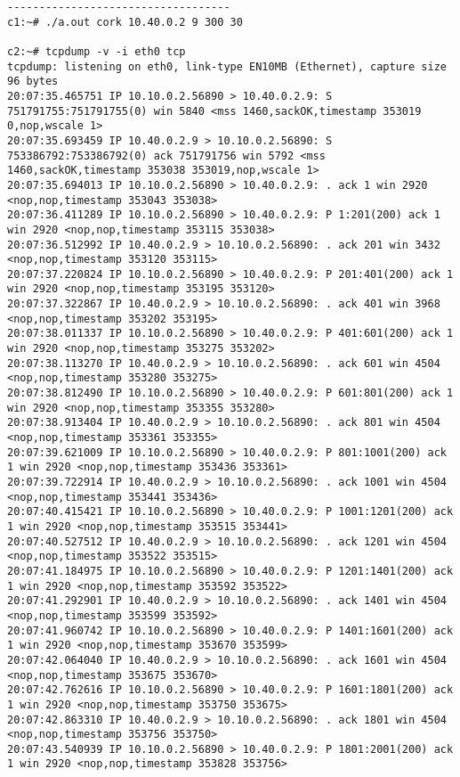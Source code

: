 \documentclass[a4paper,12pt]{article}
\begin{document}
\begin{lstlisting}
-----------------------------------
c1:~# ./a.out cork 10.40.0.2 9 300 30

c2:~# tcpdump -v -i eth0 tcp
tcpdump: listening on eth0, link-type EN10MB (Ethernet), capture size 96 bytes
20:07:35.465751 IP 10.10.0.2.56890 > 10.40.0.2.9: S 751791755:751791755(0) win 5840 <mss 1460,sackOK,timestamp 353019 0,nop,wscale 1>
20:07:35.693459 IP 10.40.0.2.9 > 10.10.0.2.56890: S 753386792:753386792(0) ack 751791756 win 5792 <mss 1460,sackOK,timestamp 353038 353019,nop,wscale 1>
20:07:35.694013 IP 10.10.0.2.56890 > 10.40.0.2.9: . ack 1 win 2920 <nop,nop,timestamp 353043 353038>
20:07:36.411289 IP 10.10.0.2.56890 > 10.40.0.2.9: P 1:201(200) ack 1 win 2920 <nop,nop,timestamp 353115 353038>
20:07:36.512992 IP 10.40.0.2.9 > 10.10.0.2.56890: . ack 201 win 3432 <nop,nop,timestamp 353120 353115>
20:07:37.220824 IP 10.10.0.2.56890 > 10.40.0.2.9: P 201:401(200) ack 1 win 2920 <nop,nop,timestamp 353195 353120>
20:07:37.322867 IP 10.40.0.2.9 > 10.10.0.2.56890: . ack 401 win 3968 <nop,nop,timestamp 353202 353195>
20:07:38.011337 IP 10.10.0.2.56890 > 10.40.0.2.9: P 401:601(200) ack 1 win 2920 <nop,nop,timestamp 353275 353202>
20:07:38.113270 IP 10.40.0.2.9 > 10.10.0.2.56890: . ack 601 win 4504 <nop,nop,timestamp 353280 353275>
20:07:38.812490 IP 10.10.0.2.56890 > 10.40.0.2.9: P 601:801(200) ack 1 win 2920 <nop,nop,timestamp 353355 353280>
20:07:38.913404 IP 10.40.0.2.9 > 10.10.0.2.56890: . ack 801 win 4504 <nop,nop,timestamp 353361 353355>
20:07:39.621009 IP 10.10.0.2.56890 > 10.40.0.2.9: P 801:1001(200) ack 1 win 2920 <nop,nop,timestamp 353436 353361>
20:07:39.722914 IP 10.40.0.2.9 > 10.10.0.2.56890: . ack 1001 win 4504 <nop,nop,timestamp 353441 353436>
20:07:40.415421 IP 10.10.0.2.56890 > 10.40.0.2.9: P 1001:1201(200) ack 1 win 2920 <nop,nop,timestamp 353515 353441>
20:07:40.527512 IP 10.40.0.2.9 > 10.10.0.2.56890: . ack 1201 win 4504 <nop,nop,timestamp 353522 353515>
20:07:41.184975 IP 10.10.0.2.56890 > 10.40.0.2.9: P 1201:1401(200) ack 1 win 2920 <nop,nop,timestamp 353592 353522>
20:07:41.292901 IP 10.40.0.2.9 > 10.10.0.2.56890: . ack 1401 win 4504 <nop,nop,timestamp 353599 353592>
20:07:41.960742 IP 10.10.0.2.56890 > 10.40.0.2.9: P 1401:1601(200) ack 1 win 2920 <nop,nop,timestamp 353670 353599>
20:07:42.064040 IP 10.40.0.2.9 > 10.10.0.2.56890: . ack 1601 win 4504 <nop,nop,timestamp 353675 353670>
20:07:42.762616 IP 10.10.0.2.56890 > 10.40.0.2.9: P 1601:1801(200) ack 1 win 2920 <nop,nop,timestamp 353750 353675>
20:07:42.863310 IP 10.40.0.2.9 > 10.10.0.2.56890: . ack 1801 win 4504 <nop,nop,timestamp 353756 353750>
20:07:43.540939 IP 10.10.0.2.56890 > 10.40.0.2.9: P 1801:2001(200) ack 1 win 2920 <nop,nop,timestamp 353828 353756>

\end{lstlisting}
\end{document}
